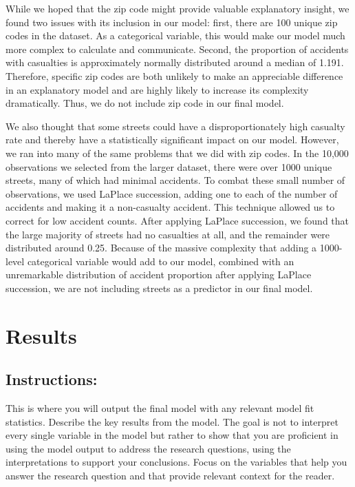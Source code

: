 \documentclass[
  letterpaper,
  DIV=11,
  numbers=noendperiod]{scrartcl}
\begin{document}
While we hoped that the zip code might provide valuable explanatory
insight, we found two issues with its inclusion in our model: first,
there are 100 unique zip codes in the dataset. As a categorical
variable, this would make our model much more complex to calculate and
communicate. Second, the proportion of accidents with casualties is
approximately normally distributed around a median of 1.191. Therefore,
specific zip codes are both unlikely to make an appreciable difference
in an explanatory model and are highly likely to increase its complexity
dramatically. Thus, we do not include zip code in our final model.

We also thought that some streets could have a disproportionately high
casualty rate and thereby have a statistically significant impact on our
model. However, we ran into many of the same problems that we did with
zip codes. In the 10,000 observations we selected from the larger
dataset, there were over 1000 unique streets, many of which had minimal
accidents. To combat these small number of observations, we used LaPlace
succession, adding one to each of the number of accidents and making it
a non-casualty accident. This technique allowed us to correct for low
accident counts. After applying LaPlace succession, we found that the
large majority of streets had no casualties at all, and the remainder
were distributed around 0.25. Because of the massive complexity that
adding a 1000-level categorical variable would add to our model,
combined with an unremarkable distribution of accident proportion after
applying LaPlace succession, we are not including streets as a predictor
in our final model.

\hypertarget{results}{%
\section{Results}\label{results}}

\hypertarget{instructions-2}{%
\subsection{Instructions:}\label{instructions-2}}

This is where you will output the final model with any relevant model
fit statistics. Describe the key results from the model. The goal is not
to interpret every single variable in the model but rather to show that
you are proficient in using the model output to address the research
questions, using the interpretations to support your conclusions. Focus
on the variables that help you answer the research question and that
provide relevant context for the reader.
\end{document}
